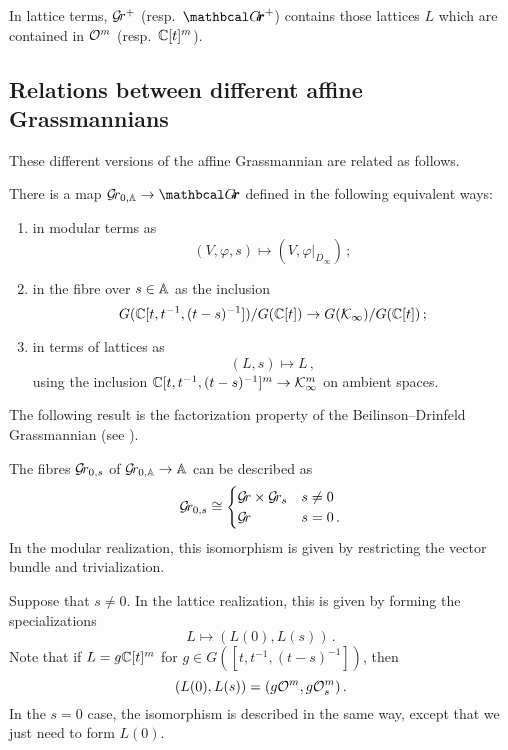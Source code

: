 \documentclass[draft]{article} %
\begin{document}
In lattice terms, $ \Gr^+$ (resp.\ ${\Grth}^+$) contains those lattices $L$ which are contained in $\cO^m$ (resp.\ $\CC[t]^m$).
% 
\subsection{Relations between different affine Grassmannians}
\label{ss:relsbtwgrs}
% 
These different versions of the affine Grassmannian are related as follows.  
% 
\begin{proposition}
    \label{pr:bd-th}
    There is a map $\Grbd \rightarrow \Grth $ defined in the following equivalent ways:
    \begin{enumerate}
        \item in modular terms as $$(V,\varphi,s)\mapsto (V, \varphi \big|_{D_\infty}) \, ;$$
        \item in the fibre over $ s \in \AA$ as the inclusion $$
        G(\CC[t, t^{-1}, (t-s)^{-1}])/ G(\CC[t]) \rightarrow G(\Kinf)/G(\CC[t])\,;$$
        \item in terms of lattices as $$(L,s)\mapsto L\,,$$ using the inclusion $\CC[t, t^{-1}, (t-s)^{-1}]^m \rightarrow \Kinf^m$ on ambient spaces. 
    \end{enumerate}
\end{proposition}
% 

The following result is the factorization property of the Beilinson--Drinfeld Grassmannian (see \cite[Prop. 3.13]{zhu2016introduction}).
\begin{proposition}
    \label{pr:polyno-taylor}
    The fibres $ \Gr_{0,s}$ of $ \Grbd \rightarrow \AA$ can be described as %
    \begin{equation*}
    \Gr_{0,s} \cong 
        \begin{cases} 
            \Gr \times \Gr_s & s \ne 0 \\
            \Gr              & s = 0\,.
        \end{cases}
    \end{equation*}
    In the modular realization, this isomorphism is given by restricting the vector bundle and trivialization.
    
    Suppose that $ s \ne 0 $. In the lattice realization, this is given by forming the specializations 
    $$
        L \mapsto (L(0), L(s))\,.
    $$
    Note that if $ L = g \CC[t]^m$ for $ g \in G([t,t^{-1}, (t-s)^{-1}])$, then 
    $$
        (L(0), L(s)) = (g \cO^m, g\cO^m_s)\,. 
    $$
    In the $ s = 0 $ case, the isomorphism is described in the same way, except that we just need to form $ L(0)$.
\end{proposition}
\end{document}
